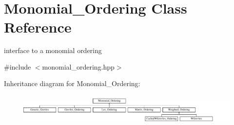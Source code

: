 \hypertarget{class_monomial___ordering}{}\section{Monomial\+\_\+\+Ordering Class Reference}
\label{class_monomial___ordering}


interface to a monomial ordering  




{\ttfamily \#include $<$monomial\+\_\+ordering.\+hpp$>$}

Inheritance diagram for Monomial\+\_\+\+Ordering\+:\begin{figure}[H]
\begin{center}
\leavevmode
\includegraphics[height=1.581921cm]{class_monomial___ordering}
\end{center}
\end{figure}
